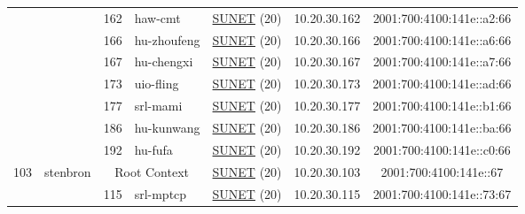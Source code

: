 \begin{small}
\begin{center}
\begin{longtable}{|c|c|c|c|c|c|c|c|}
  &  & \tiny{162} & \multicolumn{1}{|l|}{\tiny{haw-cmt}} & \multicolumn{2}{|c|}{\tiny{\href{http://www.sunet.se}{SUNET} (20)}} & \tiny{10.20.30.162} & \tiny{2001:700:4100:141e::a2:66} \\* \cline{3-3}\cline{4-4}\cline{5-5}\cline{6-6}\cline{7-7}\cline{8-8}
  &  & \tiny{166} & \multicolumn{1}{|l|}{\tiny{hu-zhoufeng}} & \multicolumn{2}{|c|}{\tiny{\href{http://www.sunet.se}{SUNET} (20)}} & \tiny{10.20.30.166} & \tiny{2001:700:4100:141e::a6:66} \\* \cline{3-3}\cline{4-4}\cline{5-5}\cline{6-6}\cline{7-7}\cline{8-8}
  &  & \tiny{167} & \multicolumn{1}{|l|}{\tiny{hu-chengxi}} & \multicolumn{2}{|c|}{\tiny{\href{http://www.sunet.se}{SUNET} (20)}} & \tiny{10.20.30.167} & \tiny{2001:700:4100:141e::a7:66} \\* \cline{3-3}\cline{4-4}\cline{5-5}\cline{6-6}\cline{7-7}\cline{8-8}
  &  & \tiny{173} & \multicolumn{1}{|l|}{\tiny{uio-fling}} & \multicolumn{2}{|c|}{\tiny{\href{http://www.sunet.se}{SUNET} (20)}} & \tiny{10.20.30.173} & \tiny{2001:700:4100:141e::ad:66} \\* \cline{3-3}\cline{4-4}\cline{5-5}\cline{6-6}\cline{7-7}\cline{8-8}
  &  & \tiny{177} & \multicolumn{1}{|l|}{\tiny{srl-mami}} & \multicolumn{2}{|c|}{\tiny{\href{http://www.sunet.se}{SUNET} (20)}} & \tiny{10.20.30.177} & \tiny{2001:700:4100:141e::b1:66} \\* \cline{3-3}\cline{4-4}\cline{5-5}\cline{6-6}\cline{7-7}\cline{8-8}
  &  & \tiny{186} & \multicolumn{1}{|l|}{\tiny{hu-kunwang}} & \multicolumn{2}{|c|}{\tiny{\href{http://www.sunet.se}{SUNET} (20)}} & \tiny{10.20.30.186} & \tiny{2001:700:4100:141e::ba:66} \\* \cline{3-3}\cline{4-4}\cline{5-5}\cline{6-6}\cline{7-7}\cline{8-8}
  &  & \tiny{192} & \multicolumn{1}{|l|}{\tiny{hu-fufa}} & \multicolumn{2}{|c|}{\tiny{\href{http://www.sunet.se}{SUNET} (20)}} & \tiny{10.20.30.192} & \tiny{2001:700:4100:141e::c0:66} \\ \hline
 \multirow{11}{*}{\tiny{103}} & \multicolumn{1}{|l|}{\multirow{11}{*}{\tiny{stenbron}}} & \multicolumn{2}{|c|}{\tiny{Root Context}} & \multicolumn{2}{|c|}{\tiny{\href{http://www.sunet.se}{SUNET} (20)}} & \tiny{10.20.30.103} & \tiny{2001:700:4100:141e::67} \\* \cline{3-3}\cline{4-4}\cline{5-5}\cline{6-6}\cline{7-7}\cline{8-8}
  &  & \tiny{115} & \multicolumn{1}{|l|}{\tiny{srl-mptcp}} & \multicolumn{2}{|c|}{\tiny{\href{http://www.sunet.se}{SUNET} (20)}} & \tiny{10.20.30.115} & \tiny{2001:700:4100:141e::73:67} \\* \cline{3-3}\cline{4-4}\cline{5-5}\cline{6-6}\cline{7-7}\cline{8-8}

\end{longtable}
\end{center}
\end{small}
